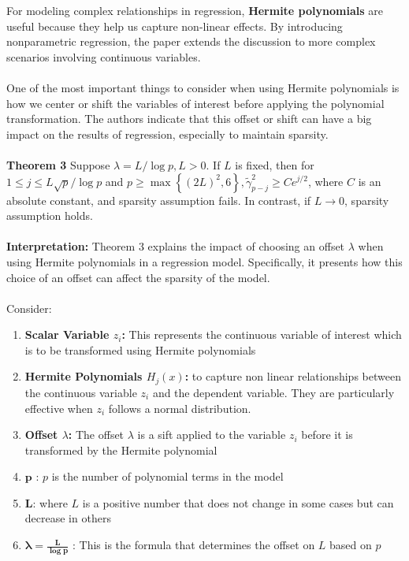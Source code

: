 For modeling complex relationships in regression, \textbf{Hermite polynomials} are useful because they help us capture non-linear effects. By introducing nonparametric regression, the paper extends the discussion to more complex scenarios involving continuous variables. \\
\\
One of the most important things to consider when using Hermite polynomials is how we center or shift the variables of interest before applying the polynomial transformation. The authors indicate that this offset or shift can have a big impact on the results of regression, especially to maintain sparsity.\\
\\
\textbf{Theorem 3} Suppose $\lambda=L / \log p, L>0$. If $L$ is fixed, then for $1 \leq j \leq L \sqrt{p} / \log p$ and $p \geq \max \left\{(2 L)^2, 6\right\}, \tilde{\gamma}_{p-j}^2 \geq C e^{j / 2}$, where $C$ is an absolute constant, and sparsity assumption fails. In contrast, if $L \rightarrow 0$, sparsity assumption holds.\\
\\
\textbf{Interpretation:} Theorem 3 explains the impact of choosing an offset $\lambda$ when using Hermite polynomials in a regression model. Specifically, it presents how this choice of an offset can affect the sparsity of the model. \\
\\
Consider:
\begin{enumerate}
    \item \textbf{Scalar Variable $z_i$:} This represents the continuous variable of interest which is to be transformed using Hermite polynomials
    \item \textbf{Hermite Polynomials $H_j (x)$:} to capture non linear relationships between the continuous variable $z_i$ and the dependent variable. They are particularly effective when $z_i$ follows a normal distribution. 
    \item \textbf{Offset $\lambda$:} The offset $\lambda$ is a sift applied to the variable $z_i$ before it is transformed by the Hermite polynomial
    \item $\boldsymbol{p}$ :  $p$ is the number of polynomial terms in the model
    \item $\boldsymbol{L}$: where $L$ is a positive number that does not change in some cases but can decrease in others
    \item $\boldsymbol{\lambda = \frac{L}{\log p}}$ : This is the formula that determines the offset on $L$ based on $p$
\end{enumerate}

